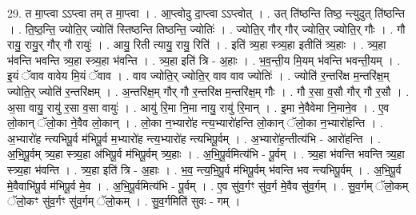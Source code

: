 \documentclass[17pt]{extarticle}
\begin{document}
29. त मा॒प्त्वा ऽऽप्त्वा तम् त मा॒प्त्वा । . आ॒प्त्वोदु दा॒प्त्वा ऽऽप्त्वोत् । . उत् ति॑ष्ठन्ति तिष्ठ॒ न्त्युदुत् ति॑ष्ठन्ति । . ति॒ष्ठ॒न्ति॒ ज्योति॒र् ज्योति॑ स्तिष्ठन्ति तिष्ठन्ति॒ ज्योतिः॑ । . ज्योति॒र् गौर् गौर् ज्योति॒र् ज्योति॒र् गौः । . गौ रायु॒ रायु॒र् गौर् गौ रायुः॑ । . आयु॒ रिती त्यायु॒ रायु॒ रिति॑ । . इति॑ त्र्य॒हा स्त्र्य॒हा इतीति॑ त्र्य॒हाः । . त्र्य॒हा भ॑वन्ति भवन्ति त्र्य॒हा स्त्र्य॒हा भ॑वन्ति । . त्र्य॒हा इति॑ त्रि - अ॒हाः । . भ॒व॒न्ती॒य मि॒यम् भ॑वन्ति भवन्ती॒यम् । . इ॒यं ॅवाव वावेय मि॒यं ॅवाव । . वाव ज्योति॒र् ज्योति॒र् वाव वाव ज्योतिः॑ । . ज्योति॑ र॒न्तरि॑क्ष म॒न्तरि॑क्ष॒म् ज्योति॒र् ज्योति॑ र॒न्तरि॑क्षम् । . अ॒न्तरि॑क्ष॒म् गौर् गौ र॒न्तरि॑क्ष म॒न्तरि॑क्ष॒म् गौः । . गौ र॒सा व॒सौ गौर् गौ र॒सौ । . अ॒सा वायु॒ रायु॑ र॒सा व॒सा वायुः॑ । . आयु॑ रि॒मा नि॒मा नायु॒ रायु॑ रि॒मान् । . इ॒मा ने॒वैवेमा नि॒माने॒व । . ए॒व लो॒कान् ॅलो॒का ने॒वैव लो॒कान् । . लो॒का न॒भ्यारो॑ह न्त्य॒भ्यारो॑हन्ति लो॒कान् ॅलो॒का न॒भ्यारो॑हन्ति । . अ॒भ्यारो॑ह न्त्यभिपू॒र्व म॑भिपू॒र्व म॒भ्यारो॑ह न्त्य॒भ्यारो॑ह न्त्यभिपू॒र्वम् । . अ॒भ्यारो॑ह॒न्तीत्य॑भि - आरो॑हन्ति । . अ॒भि॒पू॒र्वम् त्र्य॒हा स्त्र्य॒हा अ॑भिपू॒र्व म॑भिपू॒र्वम् त्र्य॒हाः । . अ॒भि॒पू॒र्वमित्य॑भि - पू॒र्वम् । . त्र्य॒हा भ॑वन्ति भवन्ति त्र्य॒हा स्त्र्य॒हा भ॑वन्ति । . त्र्य॒हा इति॑ त्रि - अ॒हाः । . भ॒व॒ न्त्य॒भि॒पू॒र्व म॑भिपू॒र्वम् भ॑वन्ति भव न्त्यभिपू॒र्वम् । . अ॒भि॒पू॒र्व मे॒वैवाभि॑पू॒र्व म॑भिपू॒र्व मे॒व । . अ॒भि॒पू॒र्वमित्य॑भि - पू॒र्वम् । . ए॒व सु॑व॒र्गꣳ सु॑व॒र्ग मे॒वैव सु॑व॒र्गम् । . सु॒व॒र्गम् ॅलो॒कम् ॅलो॒कꣳ सु॑व॒र्गꣳ सु॑व॒र्गम् ॅलो॒कम् । . सु॒व॒र्गमिति॑ सुवः - गम् । \newline
\end{document}
